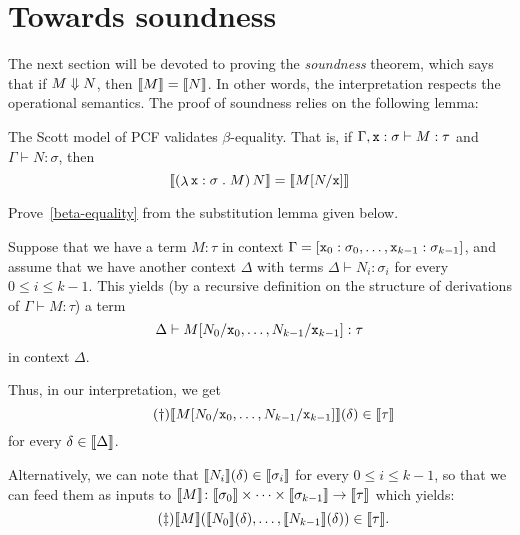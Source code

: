 \section{Towards soundness}

The next section will be devoted to proving the \emph{soundness} theorem, which
says that if \(M \Downarrow N\), then \(\llbracket M\rrbracket = \llbracket N\rrbracket\). In other words,
the interpretation respects the operational semantics.
%
The proof of soundness relies on the following lemma:%

\begin{lemma}\label{beta-equality}
  The Scott model of PCF validates \(\beta\)-equality. That is, if
  \(\Gamma,\mathtt x : \sigma \vdash M : \tau\) and \(\Gamma \vdash N : \sigma\),
  then
  \[
    \densem*{\pa*{\lambdadot{\var x : \sigma}{M}}\,N} = \densem{M[N/\var x]}
  \]
\end{lemma}

\begin{exercise}\label{exer:beta-equality}
  Prove~\cref{beta-equality} from the substitution lemma given below.
\end{exercise}


Suppose that we have a term \(M : \tau\) in context
\(\Gamma = [\mathtt x_0 : \sigma_0 , \dots , \mathtt x_{k-1} : \sigma_{k-1}]\), and
assume that we have another context \(\Delta\) with terms
\(\Delta \vdash N_i : \sigma_i\) for every \(0 \leq i \leq k-1\).
%
This yields (by a recursive definition on the structure of derivations of
\(\Gamma \vdash M : \tau\)) a term
\[
  \Delta \vdash M[N_0/\mathtt x_0,\dots,N_{k-1}/\mathtt x_{k-1}] : \tau
\]
in context \(\Delta\).

Thus, in our interpretation, we get
\begin{equation*}\label{subst-1}\tag{\(\dagger\)}
  \llbracket M[N_0/\mathtt x_0,\dots,N_{k-1}/\mathtt x_{k-1}]\rrbracket(\delta) \in \llbracket\tau\rrbracket
\end{equation*}
for every \(\delta \in \llbracket\Delta\rrbracket\).

Alternatively, we can note that \(\llbracket N_i\rrbracket(\delta) \in \llbracket\sigma_i\rrbracket\)
for every \(0 \leq i \leq k-1\), so that we can feed them as inputs to
\(\llbracket M\rrbracket \colon \llbracket\sigma_0\rrbracket \times \cdots \times \llbracket\sigma_{k-1}\rrbracket
\to \llbracket\tau\rrbracket\) which yields:
\begin{equation*}\label{subst-2}\tag{\(\ddagger\)}
  \densem{M}\pa*{\densem{N_0}(\delta),\dots,\densem{N_{k-1}}(\delta)} \in \densem{\tau}.
\end{equation*}

